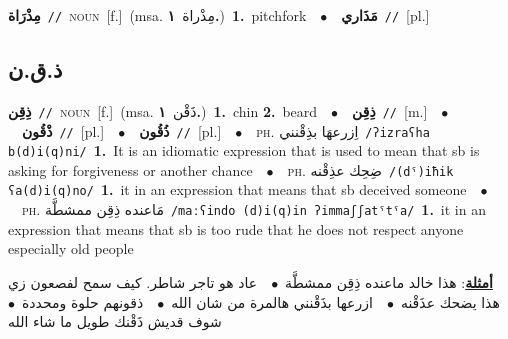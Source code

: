 \documentclass[10pt,a4paper,twoside]{article} %
\begin{document}
\begin{multicols}{2}
{{{{\setlength\topsep{0pt}\textbf{\foreignlanguage{arabic}{مِذْرَاة}}\ {\color{gray}\texttt{//}\color{black}}\ \textsc{noun}\ [f.]\ \color{gray}(msa. \foreignlanguage{arabic}{مِذْراة}~\foreignlanguage{arabic}{\textbf{١.}})\color{black}\ \textbf{1.}~pitchfork\ \ $\bullet$\ \ \setlength\topsep{0pt}\textbf{\foreignlanguage{arabic}{مَذَاري}}\ {\color{gray}\texttt{//}\color{black}}\ [pl.]\ 

\vspace{-3mm}
\subsection*{\color{blue}\foreignlanguage{arabic}{ذ.ق.ن}\color{blue}{}} 

{\setlength\topsep{0pt}\textbf{\foreignlanguage{arabic}{ذِقِن}}\ {\color{gray}\texttt{//}\color{black}}\ \textsc{noun}\ [f.]\ \color{gray}(msa. \foreignlanguage{arabic}{ذَقْن}~\foreignlanguage{arabic}{\textbf{١.}})\color{black}\ \textbf{1.}~chin  \textbf{2.}~beard\ \ $\bullet$\ \ \setlength\topsep{0pt}\textbf{\foreignlanguage{arabic}{ذِقِن}}\ {\color{gray}\texttt{//}\color{black}}\ [m.]\ \ $\bullet$\ \ \setlength\topsep{0pt}\textbf{\foreignlanguage{arabic}{ذْقُون}}\ {\color{gray}\texttt{//}\color{black}}\ [pl.]\ \ $\bullet$\ \ \setlength\topsep{0pt}\textbf{\foreignlanguage{arabic}{ذُقُون}}\ {\color{gray}\texttt{//}\color{black}}\ [pl.]\ \ $\bullet$\ \ \textsc{ph.} \color{gray} \foreignlanguage{arabic}{اِزرعهَا بذِقْنني}\color{black}\ {\color{gray}\texttt{/{\sffamily ʔizraʕha b(d)i(q)ni}/}\color{black}}\ \textbf{1.}~It is an idiomatic expression that is used to mean that sb is asking for forgiveness or another chance\ \ $\bullet$\ \ \textsc{ph.} \color{gray} \foreignlanguage{arabic}{ضِحِك عذِقْنه}\color{black}\ {\color{gray}\texttt{/{\sffamily (dˤ)iħik ʕa(d)i(q)no}/}\color{black}}\ \textbf{1.}~it in an expression that means that sb deceived someone\ \ $\bullet$\ \ \textsc{ph.} \color{gray} \foreignlanguage{arabic}{مَاعنده ذِقِن ممشطَّة}\color{black}\ {\color{gray}\texttt{/{\sffamily maːʕindo (d)i(q)in ʔimmaʃʃatˤtˤa}/}\color{black}}\ \textbf{1.}~it in an expression that means that sb is too rude that he does not respect anyone especially old people\  \begin{flushright}\color{gray}\foreignlanguage{arabic}{\textbf{\underline{\foreignlanguage{arabic}{أمثلة}}}: هذا خالد ماعنده ذِقِن ممشطَّة\ $\bullet$\ \  عاد هو تاجر شاطر. كيف سمح لفصعون زي هذا يضحك عذَقْنه\ $\bullet$\ \  ازرعها بذَقْنني هالمرة من شان الله\ $\bullet$\ \  ذقونهم حلوة ومحددة\ $\bullet$\ \  شوف قديش ذَقْنك طويل ما شاء الله}\end{flushright}\color{black}} \vspace{2mm}

}}}}
\end{multicols}
\end{document}
